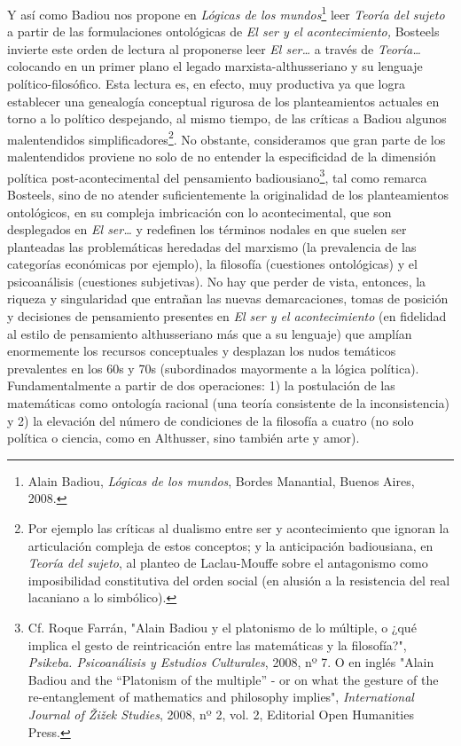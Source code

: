 \documentclass{book}
\begin{document}
Y así como Badiou nos propone en \emph{Lógicas de los mundos}\footnote{Alain
  Badiou, \emph{Lógicas de los mundos}, Bordes Manantial, Buenos Aires,
  2008.} leer \emph{Teoría del sujeto} a partir de las formulaciones
ontológicas de \emph{El ser y el acontecimiento,} Bosteels invierte este
orden de lectura al proponerse leer \emph{El ser\ldots{}} a través de
\emph{Teoría\ldots{}} colocando en un primer plano el legado
marxista-althusseriano y su lenguaje político-filosófico. Esta lectura
es, en efecto, muy productiva ya que logra establecer una genealogía
conceptual rigurosa de los planteamientos actuales en torno a lo
político despejando, al mismo tiempo, de las críticas a Badiou algunos
malentendidos simplificadores\footnote{Por ejemplo las críticas al
  dualismo entre ser y acontecimiento que ignoran la articulación
  compleja de estos conceptos; y la anticipación badiousiana, en
  \emph{Teoría del sujeto}, al planteo de Laclau-Mouffe sobre el
  antagonismo como imposibilidad constitutiva del orden social (en
  alusión a la resistencia del real lacaniano a lo simbólico).}. No
obstante, consideramos que gran parte de los malentendidos proviene no
solo de no entender la especificidad de la dimensión política
post-acontecimental del pensamiento badiousiano\footnote{Cf. Roque
  Farrán, "Alain Badiou y el platonismo de lo múltiple, o ¿qué implica
  el gesto de reintricación entre las matemáticas y la filosofía?",
  \emph{Psikeba. Psicoanálisis y Estudios Culturales}, 2008, nº 7. O en
  inglés "Alain Badiou and the ``Platonism of the multiple'' - or on
  what the gesture of the re-entanglement of mathematics and philosophy
  implies", \emph{International Journal of Žižek Studies}, 2008, nº 2,
  vol. 2, Editorial Open Humanities Press.}, tal como remarca Bosteels,
sino de no atender suficientemente la originalidad de los planteamientos
ontológicos, en su compleja imbricación con lo acontecimental, que son
desplegados en \emph{El ser\ldots{}} y redefinen los términos nodales en
que suelen ser planteadas las problemáticas heredadas del marxismo (la
prevalencia de las categorías económicas por ejemplo), la filosofía
(cuestiones ontológicas) y el psicoanálisis (cuestiones subjetivas). No
hay que perder de vista, entonces, la riqueza y singularidad que
entrañan las nuevas demarcaciones, tomas de posición y decisiones de
pensamiento presentes en \emph{El ser y el acontecimiento} (en fidelidad
al estilo de pensamiento althusseriano más que a su lenguaje) que
amplían enormemente los recursos conceptuales y desplazan los nudos
temáticos prevalentes en los 60s y 70s (subordinados mayormente a la
lógica política). Fundamentalmente a partir de dos operaciones: 1) la
postulación de las matemáticas como ontología racional (una teoría
consistente de la inconsistencia) y 2) la elevación del número de
condiciones de la filosofía a cuatro (no solo política o ciencia, como
en Althusser, sino también arte y amor).
\end{document}
